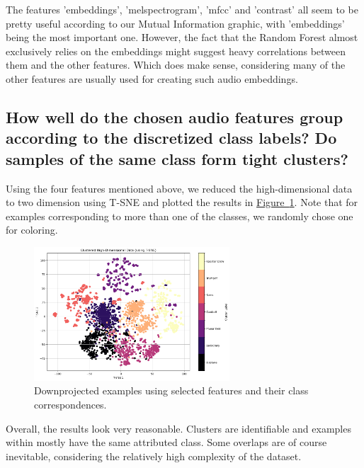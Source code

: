 The features 'embeddings', 'melspectrogram', 'mfcc' and 'contrast' all seem to be pretty useful according to our Mutual Information graphic, with 'embeddings' being the most important one. However, the fact that the Random Forest almost exclusively relies on the embeddings might suggest heavy correlations between them and the other features. Which does make sense, considering many of the other features are usually used for creating such audio embeddings.


\subsection{How well do the chosen audio features group according to the discretized class labels? Do samples of the same class form tight clusters?}
\label{sec:Labeling Function:c}
Using the four features mentioned above, we reduced the high-dimensional data to two dimension using T-SNE and plotted the results in \hyperref[fig:1_TSNE]{Figure~\ref*{fig:1_TSNE}}. Note that for examples corresponding to more than one of the classes, we randomly chose one for coloring.

\begin{figure}[htbp]
    \centering
    \includegraphics[width=0.5\linewidth, height=5cm]{figs/1_TSNE.png}
    \caption{Downprojected examples using selected features and their class correspondences.}
    \label{fig:1_TSNE}
\end{figure}

Overall, the results look very reasonable. Clusters are identifiable and examples within mostly have the same attributed class. Some overlaps are of course inevitable, considering the relatively high complexity of the dataset. 